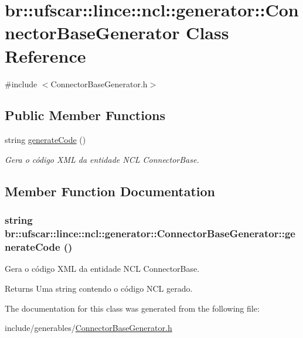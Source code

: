 \hypertarget{classbr_1_1ufscar_1_1lince_1_1ncl_1_1generator_1_1ConnectorBaseGenerator}{
\section{br::ufscar::lince::ncl::generator::ConnectorBaseGenerator Class Reference}
\label{classbr_1_1ufscar_1_1lince_1_1ncl_1_1generator_1_1ConnectorBaseGenerator}
}


{\ttfamily \#include $<$ConnectorBaseGenerator.h$>$}

\subsection*{Public Member Functions}
\begin{DoxyCompactItemize}
\item 
string \hyperlink{classbr_1_1ufscar_1_1lince_1_1ncl_1_1generator_1_1ConnectorBaseGenerator_a83f69d7090b8a360908c37b947f709c5}{generateCode} ()
\begin{DoxyCompactList}\small\item\em Gera o código XML da entidade NCL ConnectorBase. \item\end{DoxyCompactList}\end{DoxyCompactItemize}


\subsection{Member Function Documentation}
\hypertarget{classbr_1_1ufscar_1_1lince_1_1ncl_1_1generator_1_1ConnectorBaseGenerator_a83f69d7090b8a360908c37b947f709c5}{
\subsubsection[{generateCode}]{\setlength{\rightskip}{0pt plus 5cm}string br::ufscar::lince::ncl::generator::ConnectorBaseGenerator::generateCode ()}}
\label{classbr_1_1ufscar_1_1lince_1_1ncl_1_1generator_1_1ConnectorBaseGenerator_a83f69d7090b8a360908c37b947f709c5}


Gera o código XML da entidade NCL ConnectorBase. 

\begin{DoxyReturn}{Returns}
Uma string contendo o código NCL gerado. 
\end{DoxyReturn}


The documentation for this class was generated from the following file:\begin{DoxyCompactItemize}
\item 
include/generables/\hyperlink{ConnectorBaseGenerator_8h}{ConnectorBaseGenerator.h}\end{DoxyCompactItemize}
